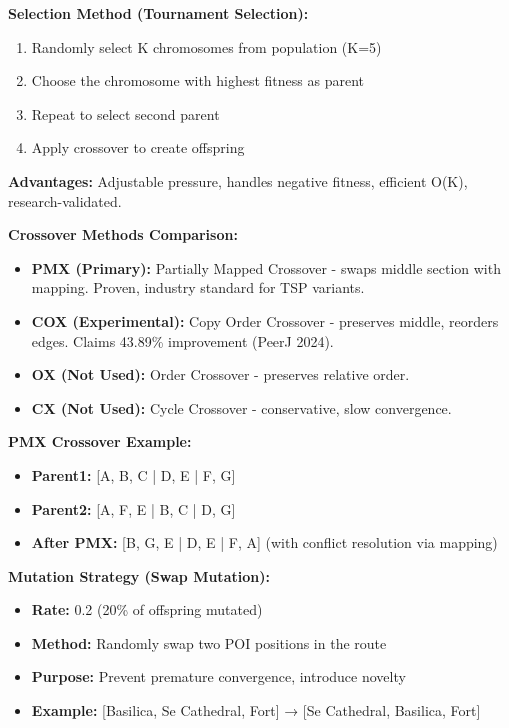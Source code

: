 \textbf{Selection Method (Tournament Selection):}
\begin{enumerate}
\item Randomly select K chromosomes from population (K=5)
\item Choose the chromosome with highest fitness as parent
\item Repeat to select second parent
\item Apply crossover to create offspring
\end{enumerate}
\textbf{Advantages:} Adjustable pressure, handles negative fitness, efficient O(K), research-validated.

\textbf{Crossover Methods Comparison:}
\begin{itemize}
\item \textbf{PMX (Primary):} Partially Mapped Crossover - swaps middle section with mapping. Proven, industry standard for TSP variants.
\item \textbf{COX (Experimental):} Copy Order Crossover - preserves middle, reorders edges. Claims 43.89\% improvement (PeerJ 2024).
\item \textbf{OX (Not Used):} Order Crossover - preserves relative order.
\item \textbf{CX (Not Used):} Cycle Crossover - conservative, slow convergence.
\end{itemize}

\textbf{PMX Crossover Example:}
\begin{itemize}
\item \textbf{Parent1:} [A, B, C | D, E | F, G]
\item \textbf{Parent2:} [A, F, E | B, C | D, G]
\item \textbf{After PMX:} [B, G, E | D, E | F, A] (with conflict resolution via mapping)
\end{itemize}

\textbf{Mutation Strategy (Swap Mutation):}
\begin{itemize}
\item \textbf{Rate:} 0.2 (20\% of offspring mutated)
\item \textbf{Method:} Randomly swap two POI positions in the route
\item \textbf{Purpose:} Prevent premature convergence, introduce novelty
\item \textbf{Example:} [Basilica, Se Cathedral, Fort] → [Se Cathedral, Basilica, Fort]
\end{itemize}

